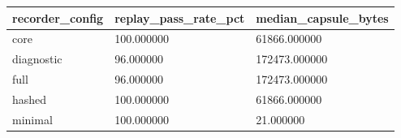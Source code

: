 \begin{tabular}{lll}
 \hline
recorder\_config & replay\_pass\_rate\_pct & median\_capsule\_bytes \\
 \hline
core & 100.000000 & 61866.000000 \\
diagnostic & 96.000000 & 172473.000000 \\
full & 96.000000 & 172473.000000 \\
hashed & 100.000000 & 61866.000000 \\
minimal & 100.000000 & 21.000000 \\
 \hline
\end{tabular}

